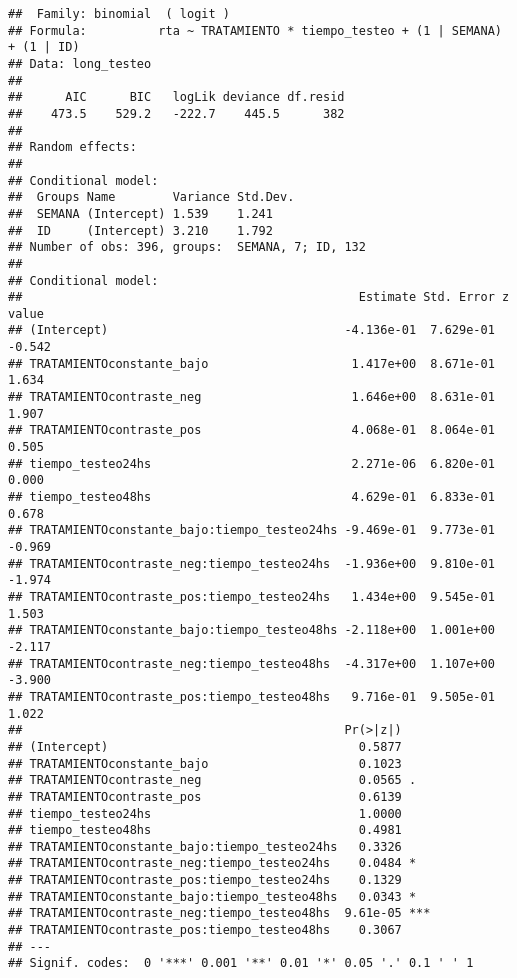 \documentclass[
]{article}
\begin{document}
\begin{verbatim}
##  Family: binomial  ( logit )
## Formula:          rta ~ TRATAMIENTO * tiempo_testeo + (1 | SEMANA) + (1 | ID)
## Data: long_testeo
## 
##      AIC      BIC   logLik deviance df.resid 
##    473.5    529.2   -222.7    445.5      382 
## 
## Random effects:
## 
## Conditional model:
##  Groups Name        Variance Std.Dev.
##  SEMANA (Intercept) 1.539    1.241   
##  ID     (Intercept) 3.210    1.792   
## Number of obs: 396, groups:  SEMANA, 7; ID, 132
## 
## Conditional model:
##                                               Estimate Std. Error z value
## (Intercept)                                 -4.136e-01  7.629e-01  -0.542
## TRATAMIENTOconstante_bajo                    1.417e+00  8.671e-01   1.634
## TRATAMIENTOcontraste_neg                     1.646e+00  8.631e-01   1.907
## TRATAMIENTOcontraste_pos                     4.068e-01  8.064e-01   0.505
## tiempo_testeo24hs                            2.271e-06  6.820e-01   0.000
## tiempo_testeo48hs                            4.629e-01  6.833e-01   0.678
## TRATAMIENTOconstante_bajo:tiempo_testeo24hs -9.469e-01  9.773e-01  -0.969
## TRATAMIENTOcontraste_neg:tiempo_testeo24hs  -1.936e+00  9.810e-01  -1.974
## TRATAMIENTOcontraste_pos:tiempo_testeo24hs   1.434e+00  9.545e-01   1.503
## TRATAMIENTOconstante_bajo:tiempo_testeo48hs -2.118e+00  1.001e+00  -2.117
## TRATAMIENTOcontraste_neg:tiempo_testeo48hs  -4.317e+00  1.107e+00  -3.900
## TRATAMIENTOcontraste_pos:tiempo_testeo48hs   9.716e-01  9.505e-01   1.022
##                                             Pr(>|z|)    
## (Intercept)                                   0.5877    
## TRATAMIENTOconstante_bajo                     0.1023    
## TRATAMIENTOcontraste_neg                      0.0565 .  
## TRATAMIENTOcontraste_pos                      0.6139    
## tiempo_testeo24hs                             1.0000    
## tiempo_testeo48hs                             0.4981    
## TRATAMIENTOconstante_bajo:tiempo_testeo24hs   0.3326    
## TRATAMIENTOcontraste_neg:tiempo_testeo24hs    0.0484 *  
## TRATAMIENTOcontraste_pos:tiempo_testeo24hs    0.1329    
## TRATAMIENTOconstante_bajo:tiempo_testeo48hs   0.0343 *  
## TRATAMIENTOcontraste_neg:tiempo_testeo48hs  9.61e-05 ***
## TRATAMIENTOcontraste_pos:tiempo_testeo48hs    0.3067    
## ---
## Signif. codes:  0 '***' 0.001 '**' 0.01 '*' 0.05 '.' 0.1 ' ' 1
\end{verbatim}
\end{document}
